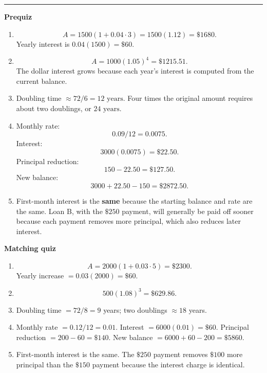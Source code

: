 \documentclass[10pt]{article}
\newcommand{\modulekey}[2]{\clearpage{\Large\bfseries\textcolor{olive}{Module #1: #2 — Answer Key}}\par\textcolor{gold}{\rule{\linewidth}{1.2pt}}\par}
\begin{document}
\modulekey{6}{Interest and Loans}
\textbf{Prequiz}
\begin{enumerate}
\item
\[
A=1500(1+0.04\cdot3)=1500(1.12)=\boxed{\$1680}.
\]
Yearly interest is \(0.04(1500)=\boxed{\$60}\).
\item
\[
A=1000(1.05)^4=\boxed{\$1215.51}.
\]
The dollar interest grows because each year's interest is computed from the current balance.
\item Doubling time \(\approx72/6=\boxed{12\text{ years}}\). Four times the original amount requires about two doublings, or \(\boxed{24\text{ years}}\).
\item Monthly rate:
\[
0.09/12=\boxed{0.0075}.
\]
Interest:
\[
3000(0.0075)=\boxed{\$22.50}.
\]
Principal reduction:
\[
150-22.50=\boxed{\$127.50}.
\]
New balance:
\[
3000+22.50-150=\boxed{\$2872.50}.
\]
\item First-month interest is the \textbf{same} because the starting balance and rate are the same. Loan B, with the \(\$250\) payment, will generally be paid off sooner because each payment removes more principal, which also reduces later interest.
\end{enumerate}

\textbf{Matching quiz}
\begin{enumerate}
\item
\[
A=2000(1+0.03\cdot5)=\boxed{\$2300}.
\]
Yearly increase \(=0.03(2000)=\boxed{\$60}\).
\item
\[
500(1.08)^3=\boxed{\$629.86}.
\]
\item Doubling time \(=72/8=\boxed9\) years; two doublings \(\approx\boxed{18}\) years.
\item Monthly rate \(=0.12/12=\boxed{0.01}\). Interest \(=6000(0.01)=\boxed{\$60}\). Principal reduction \(=200-60=\boxed{\$140}\). New balance \(=6000+60-200=\boxed{\$5860}\).
\item First-month interest is the same. The \(\$250\) payment removes \(\$100\) more principal than the \(\$150\) payment because the interest charge is identical.
\end{enumerate}
\end{document}
